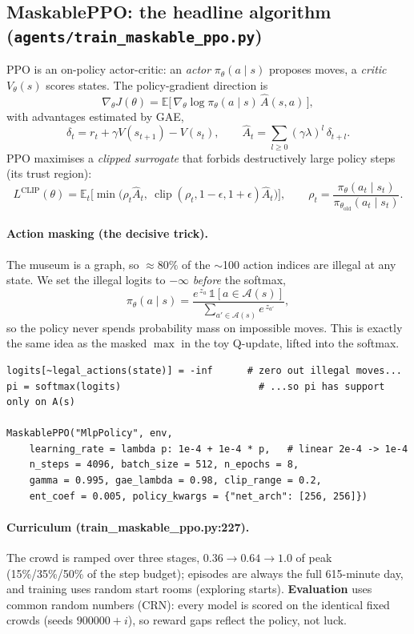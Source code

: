 \documentclass[11pt]{article}
\newcommand{\file}[1]{\texttt{\small #1}}
\newcommand{\E}{\mathbb{E}}
\newcommand{\Acal}{\mathcal{A}}
\newcommand{\ind}{\mathbb{1}}
\begin{document}
\subsection{MaskablePPO: the headline algorithm (\file{agents/train\_maskable\_ppo.py})}

PPO is an on-policy actor-critic: an \emph{actor} $\pi_\theta(a\mid s)$ proposes moves, a
\emph{critic} $V_\theta(s)$ scores states. The policy-gradient direction is
\[
\nabla_\theta J(\theta)=\E\big[\,\nabla_\theta\log\pi_\theta(a\mid s)\,\hat A(s,a)\,\big],
\]
with advantages estimated by GAE,
\[
\delta_t=r_t+\gamma V(s_{t+1})-V(s_t),\qquad \hat A_t=\sum_{l\ge0}(\gamma\lambda)^l\,\delta_{t+l}.
\]
PPO maximises a \emph{clipped surrogate} that forbids destructively large policy steps
(its trust region):
\[
\boxed{\;L^{\text{CLIP}}(\theta)=\E_t\!\Big[\min\big(\rho_t\hat A_t,\ \operatorname{clip}(\rho_t,1-\epsilon,1+\epsilon)\hat A_t\big)\Big],\qquad \rho_t=\frac{\pi_\theta(a_t\mid s_t)}{\pi_{\theta_{\text{old}}}(a_t\mid s_t)}.\;}
\]

\paragraph{Action masking (the decisive trick).} The museum is a graph, so $\approx 80\%$
of the $\sim$100 action indices are illegal at any state. We set the illegal logits to
$-\infty$ \emph{before} the softmax,
\[
\pi_\theta(a\mid s)=\frac{e^{\,z_a}\,\ind[a\in\Acal(s)]}{\sum_{a'\in\Acal(s)} e^{\,z_{a'}}},
\]
so the policy never spends probability mass on impossible moves. This is exactly the
same idea as the masked $\max$ in the toy Q-update, lifted into the softmax.

\begin{lstlisting}
logits[~legal_actions(state)] = -inf      # zero out illegal moves...
pi = softmax(logits)                        # ...so pi has support only on A(s)

MaskablePPO("MlpPolicy", env,
    learning_rate = lambda p: 1e-4 + 1e-4 * p,   # linear 2e-4 -> 1e-4
    n_steps = 4096, batch_size = 512, n_epochs = 8,
    gamma = 0.995, gae_lambda = 0.98, clip_range = 0.2,
    ent_coef = 0.005, policy_kwargs = {"net_arch": [256, 256]})
\end{lstlisting}

\paragraph{Curriculum (train\_maskable\_ppo.py:227).} The crowd is ramped over three
stages, $0.36\!\to\!0.64\!\to\!1.0$ of peak (15\%/35\%/50\% of the step budget); episodes
are always the full 615-minute day, and training uses random start rooms (exploring
starts). \textbf{Evaluation} uses common random numbers (CRN): every model is scored on
the identical fixed crowds (seeds $900000{+}i$), so reward gaps reflect the policy, not
luck.
\end{document}
